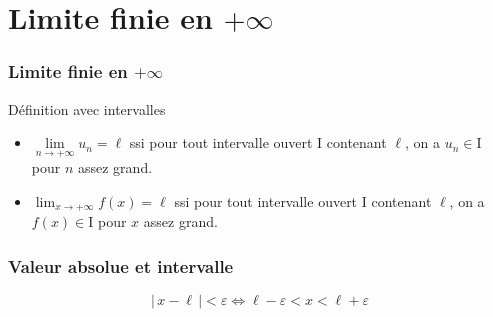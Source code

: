 \documentclass[xcolor=svgnames,t,final]{beamer}
\newcommand{\limitesuite}[1]{\lim\limits
_{n \to +\infty} #1}
\newcommand{\valabs}[1]{\big| \, #1 \, \big|}
\begin{document}
\section{Limite finie en $+\infty$}
\begin{frame}

\frametitle{Limite finie en $+\infty$}

\begin{block}{Définition avec intervalles}
\begin{itemize}
\pause \item {} 

$\limitesuite{u_{n}}=\ell$ ssi pour tout intervalle ouvert I contenant $\ell$,  on a $u_{n}\in \text{I}$ pour $n$ assez grand.

\pause \item {} 

 $\lim_{x \to +\infty}{f(x)}=\ell$ ssi pour tout intervalle ouvert I contenant $\ell$,  on a $f(x)\in \text{I}$ pour $x$ assez grand.
\end{itemize}
\end{block}

\end{frame}

\begin{frame}

\frametitle{Valeur absolue et intervalle}

\begin{equation*}
\boxed{\valabs{x - \ell}<\varepsilon \Longleftrightarrow \ell - \varepsilon < x < \ell + \varepsilon}
\end{equation*}

\begin{center}
\end{center}	 

\end{frame}
\end{document}
